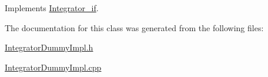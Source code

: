 Implements \hyperlink{class_integrator__if_a49c27818a4b0caf41c39d22a18b41337}{Integrator\+\_\+if}.



The documentation for this class was generated from the following files\+:\begin{DoxyCompactItemize}
\item 
\hyperlink{_integrator_dummy_impl_8h}{Integrator\+Dummy\+Impl.\+h}\item 
\hyperlink{_integrator_dummy_impl_8cpp}{Integrator\+Dummy\+Impl.\+cpp}\end{DoxyCompactItemize}
